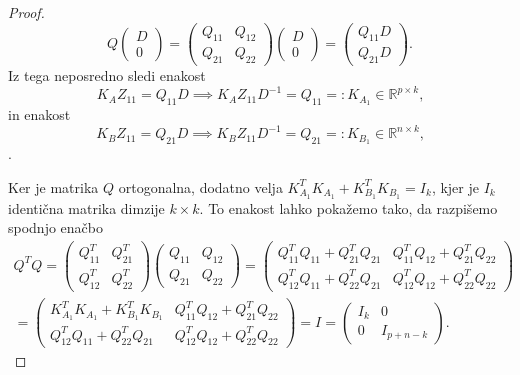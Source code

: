 \documentclass[mat1]{article}
\begin{document}
\begin{proof}
$$Q
\begin{pmatrix}
D \\ 
0
\end{pmatrix} = 
\begin{pmatrix}
Q_{11} & Q_{12} \\ 
Q_{21} & Q_{22}
\end{pmatrix}
\begin{pmatrix}
D \\ 
0
\end{pmatrix} =
\begin{pmatrix}
Q_{11} D \\ 
Q_{21} D
\end{pmatrix} \text{.}
$$
Iz tega neposredno sledi enakost
$$
K_A Z_{11} = Q_{11} D \implies K_A Z_{11} D^{-1} = Q_{11} =: K_{A_1}  \in \mathbb{R}^{p \times k} \text{,}
$$
in enakost
$$
K_B Z_{11} = Q_{21} D \implies K_B Z_{11} D^{-1} = Q_{21} =: K_{B_1} \in \mathbb{R}^{ n \times k} \text{,}
$$.

Ker je matrika $Q$ ortogonalna, dodatno velja $K_{A_1}^TK_{A_1} + K_{B_1}^TK_{B_1} = I_k$, kjer je $I_k$ identična matrika dimzije $k \times k$. To enakost lahko pokažemo tako, da razpišemo spodnjo enačbo
\begin{gather*}
Q^T Q = 
\begin{pmatrix}
Q_{11}^T & Q_{21}^T \\ 
Q_{12}^T & Q_{22}^T
\end{pmatrix}
\begin{pmatrix}
Q_{11} & Q_{12} \\ 
Q_{21} & Q_{22}
\end{pmatrix} =
\begin{pmatrix}
Q_{11}^T Q_{11} + Q_{21}^T Q_{21} & Q_{11}^T Q_{12} + Q_{21}^T Q_{22} \\ 
Q_{12}^T Q_{11} + Q_{22}^T Q_{21} & Q_{12}^T Q_{12} + Q_{22}^T Q_{22}
\end{pmatrix} \\ =
\begin{pmatrix}
K_{A_1}^TK_{A_1} + K_{B_1}^TK_{B_1} & Q_{11}^T Q_{12} + Q_{21}^T Q_{22} \\ 
Q_{12}^T Q_{11} + Q_{22}^T Q_{21} & Q_{12}^T Q_{12} + Q_{22}^T Q_{22}
\end{pmatrix}  = I =
\begin{pmatrix}
I_k & 0\\ 
0 & I_{p+n-k}
\end{pmatrix} \text{.}
\end{gather*}


\end{proof}
\end{document}
